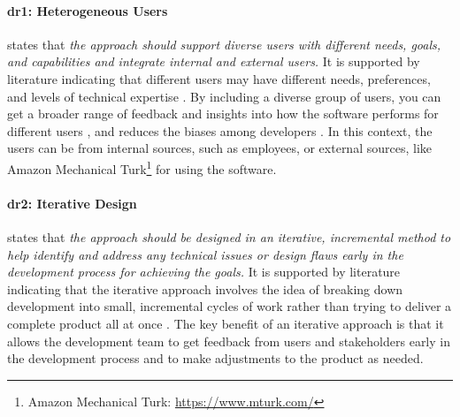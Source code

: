 
\paragraph{\ac{dr}1: Heterogeneous Users} states that \textit{the approach should support diverse users with different needs, goals, and capabilities and integrate internal and external users.} 
It is supported by literature indicating that different users may have different needs, preferences, and levels of technical expertise \cite{misc:lean:steve}.
By including a diverse group of users, you can get a broader range of feedback and insights into how the software performs for different users \cite{article:prototyping:weichbroth}, and reduces the biases among developers \cite{misc:lean:burmeister}.
In this context, the users can be from internal sources, such as employees, or external sources, like Amazon Mechanical Turk\footnote{Amazon Mechanical Turk: \url{https://www.mturk.com/}} for using the software.

\paragraph{\ac{dr}2: Iterative Design} states that \textit{the approach should be designed in an iterative, incremental method to help identify and address any technical issues or design flaws early in the development process for achieving the goals.} 
It is supported by literature indicating that the iterative approach involves the idea of breaking down development into small, incremental cycles of work rather than trying to deliver a complete product all at once \cite{misc:lean:tutorial}.
The key benefit of an iterative approach is that it allows the development team to get feedback from users and stakeholders early in the development process and to make adjustments \cite{article:experiments:lindgren} to the product as needed.

